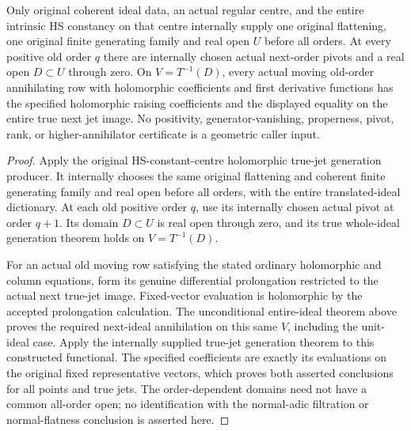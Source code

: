 \begin{theorem}
\label{hir:actual-original-hs-constant-centre-unconditional-dual-jet-raising}
\leanok
Only original coherent ideal data, an actual regular centre, and the
entire intrinsic HS constancy on that centre internally supply one
original flattening, one original finite generating family and real
open $U$ before all orders. At every positive old order $q$ there
are internally chosen actual next-order pivots and a real open
$D\subset U$ through zero. On $V=T^{-1}(D)$, every actual moving
old-order annihilating row with holomorphic coefficients and first
derivative functions has the specified holomorphic raising
coefficients and the displayed equality on the entire true next jet
image. No positivity, generator-vanishing, properness, pivot, rank,
or higher-annihilator certificate is a geometric caller input.
\end{theorem}
\begin{proof}
Apply the original HS-constant-centre holomorphic true-jet generation
producer. It internally chooses the same original flattening and
coherent finite generating family and real open before all orders,
with the entire translated-ideal dictionary. At each old positive
order $q$, use its internally chosen actual pivot at order $q+1$.
Its domain $D\subset U$ is real open through zero, and its true
whole-ideal generation theorem holds on $V=T^{-1}(D)$.

For an actual old moving row satisfying the stated ordinary
holomorphic and column equations, form its genuine differential
prolongation restricted to the actual next true-jet image. Fixed-vector
evaluation is holomorphic by the accepted prolongation calculation.
The unconditional entire-ideal theorem above proves the required
next-ideal annihilation on this same $V$, including the unit-ideal
case. Apply the internally supplied true-jet generation theorem to
this constructed functional. The specified coefficients are exactly
its evaluations on the original fixed representative vectors, which
proves both asserted conclusions for all points and true jets.
The order-dependent domains need not have a common all-order open;
no identification with the normal-adic filtration or normal-flatness
conclusion is asserted here.
\end{proof}
